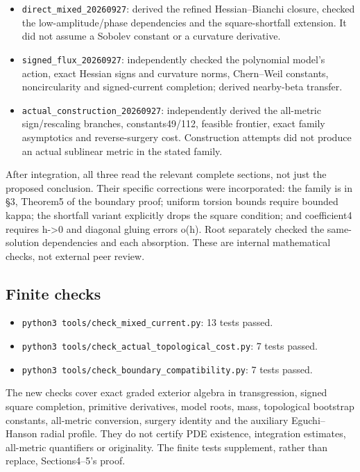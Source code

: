 \documentclass[
  10pt,
]{article}
\providecommand{\tightlist}{%
  \setlength{\itemsep}{0pt}\setlength{\parskip}{0pt}}
\begin{document}
\begin{itemize}
\tightlist
\item
  \nolinkurl{direct_mixed_20260927}: derived the refined Hessian--Bianchi
  closure, checked the low-amplitude/phase dependencies and the
  square-shortfall extension. It did not assume a Sobolev constant or a
  curvature derivative.
\item
  \nolinkurl{signed_flux_20260927}: independently checked the polynomial
  model's action, exact Hessian signs and curvature norms, Chern--Weil
  constants, noncircularity and signed-current completion; derived
  nearby-beta transfer.
\item
  \nolinkurl{actual_construction_20260927}: independently derived the
  all-metric sign/rescaling branches, constants49/112, feasible
  frontier, exact family asymptotics and reverse-surgery cost.
  Construction attempts did not produce an actual sublinear metric in
  the stated family.
\end{itemize}

After integration, all three read the relevant complete sections, not
just the proposed conclusion. Their specific corrections were
incorporated: the family is in §3, Theorem5 of the boundary proof;
uniform torsion bounds require bounded kappa; the shortfall variant
explicitly drops the square condition; and coefficient4 requires
h-\textgreater0 and diagonal gluing errors o(h). Root separately checked
the same-solution dependencies and each absorption. These are internal
mathematical checks, not external peer review.

\hypertarget{finite-checks}{%
\subsection{Finite checks}\label{finite-checks}}

\begin{itemize}
\tightlist
\item
  \texttt{python3\ tools/\nolinkurl{check_mixed_current.py}}: 13 tests passed.
\item
  \texttt{python3\ tools/\nolinkurl{check_actual_topological_cost.py}}: 7 tests
  passed.
\item
  \texttt{python3\ tools/\nolinkurl{check_boundary_compatibility.py}}: 7 tests
  passed.
\end{itemize}

The new checks cover exact graded exterior algebra in transgression,
signed square completion, primitive derivatives, model roots, mass,
topological bootstrap constants, all-metric conversion, surgery identity
and the auxiliary Eguchi--Hanson radial profile. They do not certify PDE
existence, integration estimates, all-metric quantifiers or originality.
The finite tests supplement, rather than replace, Sections4--5's proof.
\end{document}
